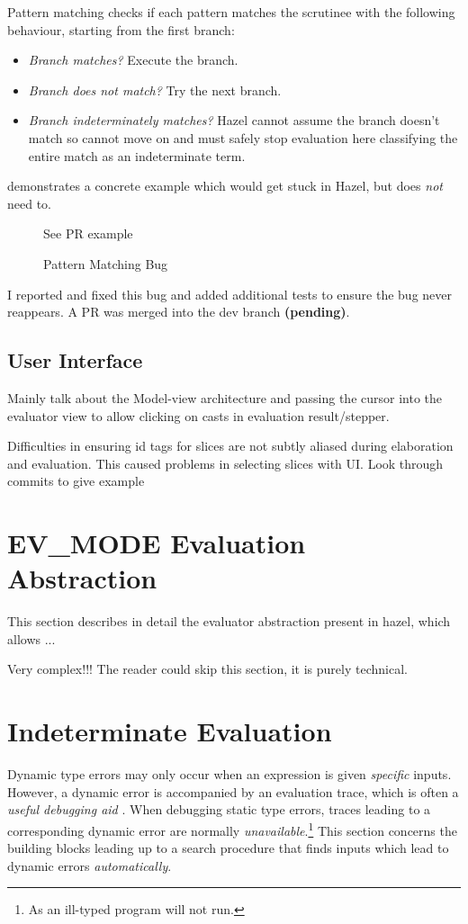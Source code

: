 Pattern matching checks if each pattern matches the scrutinee with the following behaviour, starting from the first branch:
\begin{itemize}
\item \textit{Branch matches?} Execute the branch.
\item \textit{Branch does not match?} Try the next branch.
\item \textit{Branch indeterminately matches?} Hazel cannot assume the branch doesn't match so cannot move on and must safely stop evaluation here classifying the entire match as an indeterminate term.
\end{itemize}
 demonstrates a concrete example which would get stuck in Hazel, but does \textit{not} need to.

\begin{figure}[h]
See PR example
\caption{Pattern Matching Bug}
\label{fig:PatternMatchingBug}
\end{figure}

I reported and fixed this bug and added additional tests to ensure the bug never reappears. A PR was merged into the dev branch \textbf{(pending)}.
\subsection{User Interface}
Mainly talk about the Model-view architecture and passing the cursor into the evaluator view to allow clicking on casts in evaluation result/stepper.

Difficulties in ensuring id tags for slices are not subtly aliased during elaboration and evaluation. This caused problems in selecting slices with UI. Look through commits to give example

\section{EV\_MODE Evaluation Abstraction}
This section describes in detail the evaluator abstraction present in hazel, which allows ...

Very complex!!! The reader could skip this section, it is purely technical.

\section{Indeterminate Evaluation}\label{sec:IndetEval}
Dynamic type errors may only occur when an expression is given \textit{specific} inputs. However, a dynamic error is accompanied by an evaluation trace, which is often a \textit{useful debugging aid} \cite{TraceVisualisation}. When debugging static type errors, traces leading to a corresponding dynamic error are normally \textit{unavailable}.\footnote{As an ill-typed program will not run.} This section concerns the building blocks leading up to a search procedure that finds inputs which lead to dynamic errors \textit{automatically}.

